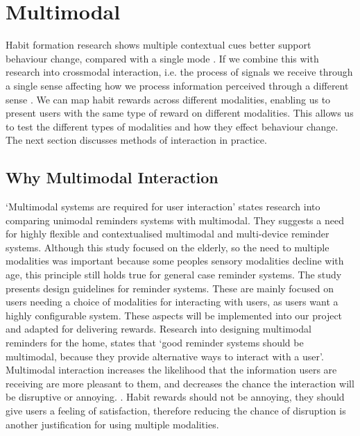 
\newpage

\section{Multimodal}
Habit formation research shows multiple contextual cues better support behaviour change, compared with a single mode \cite{article_understanding_use_contextual_cues_design_impl}. If we combine this with research into crossmodal interaction, i.e. the process of signals we receive through a single sense affecting how we process information perceived through a different sense \cite{article_natural_cross_modal_mappings}. We can map habit rewards across different modalities, enabling us to present users with the same type of reward on different modalities. This allows us to test the different types of modalities and how they effect behaviour change. The next section discusses methods of interaction in practice.

\subsection{Why Multimodal Interaction}
`Multimodal systems are required for user interaction' states research \cite{article_user_centred_multimodal_reminders} into comparing unimodal reminders systems with multimodal. They suggests a need for highly flexible and contextualised multimodal and multi-device reminder systems. Although this study focused on the elderly, so the need to multiple modalities was important because some peoples sensory modalities decline with age, this principle still holds true for general case reminder systems. The study presents design guidelines for reminder systems. These are mainly focused on users needing a choice of modalities for interacting with users, as users want a highly configurable system. These aspects will be implemented into our project and adapted for delivering rewards.\newline
\newline
Research into designing multimodal reminders for the home, states that `good reminder systems should be multimodal, because they provide alternative ways to interact with a user'. Multimodal interaction increases the likelihood that the information users are receiving are more pleasant to them, and decreases the chance the interaction will be disruptive or annoying. \cite{article_designing_multimodal_reminders_for_home}. Habit rewards should not be annoying, they should give users a feeling of satisfaction, therefore reducing the chance of disruption is another justification for using multiple modalities.

